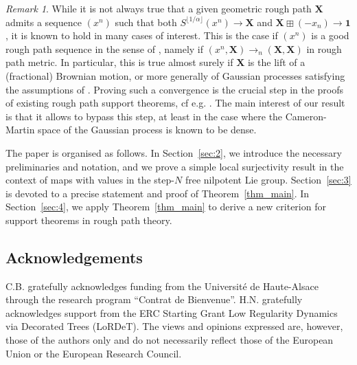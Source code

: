 \documentclass[12pt,a4paper]{article}
\numberwithin{equation}{section}
\theoremstyle{plain}
\theoremstyle{definition}
\theoremstyle{remark}
\newtheorem{remark}[theorem]{Remark}
\begin{document}
\begin{remark}
While it is not always true that a given geometric rough path $\mathbf X$ admits a sequence $(x^n)$ such that both $S^{\lfloor 1/\alpha \rfloor}(x^n) \to \mathbf X$ and $\mathbf{X} \boxplus (-x_n) \to \mathbf 1$, it is known to hold in many cases of interest. This is the case if $(x^n)$ is a good rough path sequence in the sense of \cite{Coutin07}, namely if $(x^n, \mathbf X) \to_n (\mathbf X, \mathbf X)$ in rough path metric. In particular, this is true almost surely if $\mathbf X$ is the lift of a (fractional) Brownian motion, or more generally of Gaussian processes satisfying the assumptions of \cite{FV10gaussian}. Proving such a convergence is the crucial step in the proofs of existing rough path support theorems, cf e.g. \cite[Section 15.8]{frizbook}. The main interest of our result is that it allows to bypass this step, at least in the case where the Cameron-Martin space of the Gaussian process is known to be dense.
\end{remark}

The paper is organised as follows. In Section~\ref{sec:2}, we introduce 
the necessary preliminaries and notation, and we prove a simple local surjectivity result in the context of maps with values in the step-\(N\) free nilpotent Lie group. Section~\ref{sec:3} is devoted to a precise statement and proof of Theorem~\ref{thm_main}. In Section~\ref{sec:4}, we apply Theorem~\ref{thm_main} to derive a new criterion for support  theorems in rough path theory.




\subsection*{Acknowledgements}
C.B. gratefully acknowledges funding from the Université de Haute-Alsace through the research program “Contrat de Bienvenue”.  H.N. gratefully acknowledges support from the ERC Starting Grant Low Regularity Dynamics via Decorated Trees (LoRDeT). The views and opinions expressed are, however, those of the authors only and do not necessarily reflect those of the European Union or the European Research Council.
\end{document}
